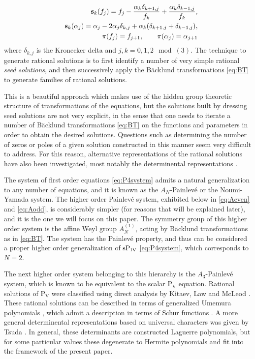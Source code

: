 \documentclass{amsart}
\theoremstyle{definition}
\newcommand{\PV}{$\mathrm{P}_{\mathrm{V}}\,\,$}
\newcommand{\Pfour}{{\rm P_{IV}}}
\begin{document}
\begin{eqnarray}\label{eq:BT}
&&{\bf s}_k (f_j)=f_j-\frac{\alpha_k\delta_{k+1,j}}{f_k}+\frac{\alpha_k\delta_{k-1,j}}{f_k}, \nonumber\\
&&{\bf s}_k(\alpha_j)=\alpha_j-2\alpha_j\delta_{k,j}+\alpha_k(\delta_{k+1,j}+\delta_{k-1,j}),\\
&&{\bf \pi}(f_j)=f_{j+1},\qquad  {\bf \pi}(\alpha_j)=\alpha_{j+1} \nonumber
\end{eqnarray}
where $\delta_{k,j}$ is the Kronecker delta and $j,k=0,1,2 \mod(3)$.
The technique to generate rational solutions is to first identify a
number of very simple rational \textit{seed solutions}, and then
successively apply the B\"acklund transformations \eqref{eq:BT} to
generate families of rational solutions.

This is a beautiful approach which makes use of the
hidden group theoretic structure of transformations of the equations,
but the solutions built by dressing seed solutions are not very explicit,
in the sense that one needs to iterate a number of B\"acklund transformations \eqref{eq:BT} on the functions and parameters in order to obtain the desired solutions. Questions such as determining the number of zeros or poles of a given solution constructed in this manner seem very difficult to address. For this reason, alternative representations of the rational solutions have also been investigated, most notably the determinental representations \cite{kajiwara1996determinant,
  kajiwara1998determinant}.

The system of first order equations \eqref{eq:P4system} admits a
natural generalization to any number of equations, and it is known as
the $A_{N}$-Painlev\'e or the Noumi-Yamada system. The higher order
Painlev\'e system, exhibited below in \eqref{eq:Aeven} and
\eqref{eq:Aodd}, is considerably simpler (for reasons that will be
explained later), and it is the one we will focus on this paper.  The
symmetry group of this higher order system is the affine Weyl group
$A_{N}^{(1)}$, acting by B\"acklund transformations as in
\eqref{eq:BT}. The system has the Painlev\'e property, and thus can be
considered a proper higher order generalization of $\rm{s}\Pfour$
\eqref{eq:P4system}, which corresponds to $N=2$.

The next higher order system belonging to this hierarchy is the
$A_3$-Painlev\'e system, which is known to be equivalent to the scalar
\PV equation.  Rational solutions of \PV were classified using direct
analysis by Kitaev, Law and McLeod \cite{kitaev1994rational}.  These
rational solutions can be described in terms of generalized Umemura
polynomials \cite{umemura1996special,masuda2002determinant}, which
admit a description in terms of Schur functions
\cite{noumi1998umemura}.  A more general determinental representations
based on universal characters was given by Tsuda
\cite{tsuda2005universal}.  In general, these determinants are
constructed Laguerre polynomials, but for some particular values these
degenerate to Hermite polynomials and fit into the framework of the
present paper.
\end{document}
